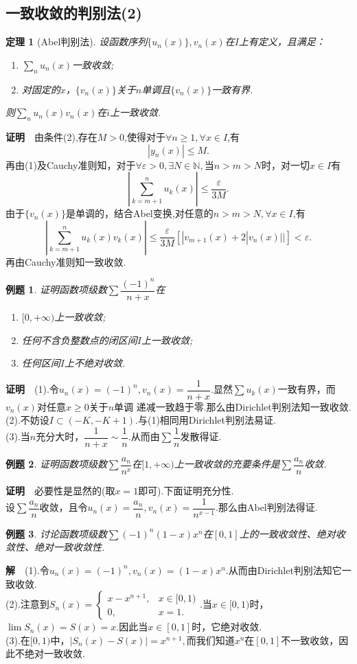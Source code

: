 \documentclass[UTF8]{article}
\newcommand{\zm}{\textbf{证明}$\quad$}
\newcommand{\jie}{\textbf{解}$\quad$}
\newtheorem{thm}{\hspace{2em}定理}[section]
\newtheorem{exa}{\hspace{2em}例题}[section]
\begin{document}
\subsection{一致收敛的判别法(2)}
\begin{thm}[Abel判别法]
  设函数序列$\{u_n(x)\},v_n(x)$在$I$上有定义，且满足：
  \begin{enumerate}
    \item $\sum_nu_n(x)$一致收敛;
    \item 对固定的$x$，$\{v_n(x)\}$关于$n$单调且$\{v_n(x)\}$一致有界.
  \end{enumerate}
  则$\sum_nu_n(x)v_n(x)$在$i$上一致收敛.
\end{thm}
\zm 由条件(2),存在$M>0$,使得对于$\forall n\ge1,\forall x\in I$,有
$$|y_n(x)|\le M.$$
再由(1)及Cauchy准则知，对于$\forall \varepsilon>0,\exists N\in \mathbb{N},$当$n>m>N$时，对一切$x\in I$有
$$\left|\sum_{k=m+1}^nu_k(x)\right|\le\frac{\varepsilon}{3M}.$$
由于$\{v_n(x)\}$是单调的，结合Abel变换,对任意的$n>m>N,\forall x\in I$,有
$$\left|\sum_{k=m+1}^nu_k(x)v_k(x)\right|\le\frac{\varepsilon}{3M}[|v_{m+1}(x)+2|v_n(x)||]<\varepsilon.$$
再由Cauchy准则知一致收敛.
\begin{exa}
  证明函数项级数$\sum\dfrac{(-1)^n}{n+x}$在
  \begin{enumerate}
    \item $[0,+\infty)$上一致收敛;
    \item 任何不含负整数点的闭区间$I$上一致收敛;
    \item 任何区间$I$上不绝对收敛.
  \end{enumerate}
\end{exa}
\zm (1).令$u_n(x)=(-1)^n,v_n(x)=\dfrac{1}{n+x}.$显然$\sum u_k(x)$一致有界，而$v_n(x)$对任意$x\ge0$关于$n$单调
递减一致趋于零.那么由Dirichlet判别法知一致收敛.\\
(2).不妨设$I\subset(-K,-K+1)$.与(1)相同用Dirichlet判别法易证.\\
(3).当$n$充分大时，$\dfrac{1}{n+x}\sim \dfrac{1}{n}.$从而由$\sum \dfrac{1}{n}$发散得证.
\begin{exa}
  证明函数项级数$\sum \dfrac{a_n}{n^x}$在$[1,+\infty)$上一致收敛的充要条件是$\sum\dfrac{a_n}{n}$收敛.
\end{exa}
\zm 必要性是显然的(取$x=1$即可).下面证明充分性.\\
设$\sum\dfrac{a_n}{n}$收敛，且令$u_n(x)=\dfrac{a_n}{n},v_n(x)=\dfrac{1}{n^{x-1}}.$那么由Abel判别法得证.
\begin{exa}
  讨论函数项级数$\sum(-1)^n(1-x)x^n$在$[0,1]$上的一致收敛性、绝对收敛性、绝对一致收敛性.
\end{exa}
\jie (1).令$u_n(x)=(-1)^n,v_n(x)=(1-x)x^n$.从而由Dirichlet判别法知它一致收敛.\\
(2).注意到$S_n(x)=\begin{cases}x-x^{n+1},&x\in[0,1)\\0,&x=1.\end{cases}$.当$x\in[0,1)$时，$\lim S_n(x)=S(x)
=x.$因此当$x\in[0,1]$时，它绝对收敛.\\
(3).在$[0,1)$中，$|S_n(x)-S(x)|=x^{n+1},$而我们知道$x^n$在$[0,1]$不一致收敛，因此不绝对一致收敛.
\end{document}
